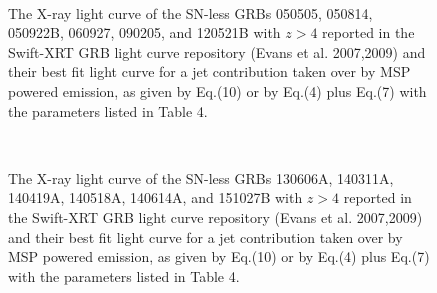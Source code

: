 \documentclass[twocolumn]{aastex61}
\begin{document}
\begin{figure}[]
\centering   
\vspace{-1cm}
\vbox{
\hbox{
}}
\vbox{
\hbox{
}}
\vbox{
\hbox{
}}
\caption{The X-ray light curve of the SN-less GRBs
050505, 050814, 050922B, 060927, 090205, and 120521B with $z>4$
reported in the Swift-XRT GRB light curve repository
(Evans et al. 2007,2009)
and their best fit light curve for a jet contribution taken over
by MSP powered emission, as given by Eq.(10) or by Eq.(4) plus Eq.(7)  
with the parameters listed in Table 4.}
\label{Fig9}
\end{figure} 

\begin{figure}[]
\centering   
\vbox{
\hbox{
}}
\vbox{
\hbox{
}}
\vbox{
\hbox{
}}
\caption{The X-ray light curve of the SN-less GRBs
130606A, 140311A, 140419A, 140518A, 140614A, and 151027B with $z>4$
reported in the Swift-XRT GRB light curve repository
(Evans et al. 2007,2009)
and their best fit light curve for a jet contribution taken over
by MSP powered emission, as given by Eq.(10) or by Eq.(4) plus Eq.(7) 
with the parameters listed in Table 4.}
\label{Fig10}
\end{figure}
\end{document}
